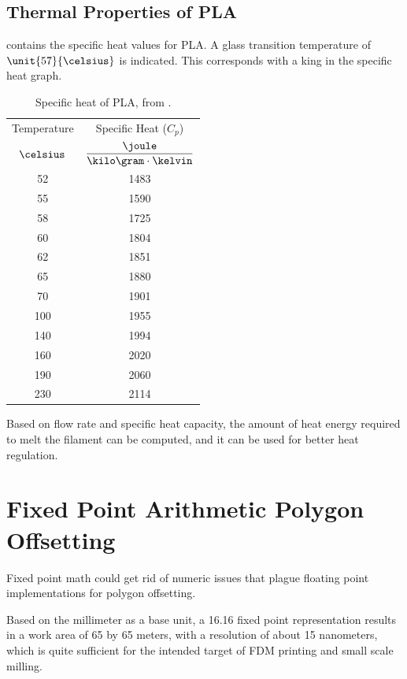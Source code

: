 \documentclass[12pt,a4paper,oneside,openany]{article}
\begin{document}
\subsection{Thermal Properties of PLA}

 contains the specific heat values for PLA. A glass transition temperature of $\unit{57}{\celsius}$ is indicated. This corresponds with a king in the specific heat graph.


\begin{table}[htdp]
\caption{Specific heat of PLA, from \cite{mfr}.}
\begin{center}
\begin{tabular}{cc}
\toprule Temperature & Specific Heat ($C_p$)\\
$\celsius$ & $\dfrac{\joule}{\kilo\gram \cdot \kelvin}$ \\
\midrule 52 & 1483 \\
55 & 1590 \\
58 & 1725 \\
60 & 1804 \\
62 & 1851 \\
65 & 1880 \\
70 & 1901 \\
100 & 1955 \\
140 & 1994 \\
160 & 2020 \\
190 & 2060 \\
230 & 2114 \\
\bottomrule 
\end{tabular}
\end{center}
\label{table:plaheat}
\end{table}%

Based on flow rate and specific heat capacity, the amount of heat energy required to melt the filament can be computed, and it can be used for better heat regulation.

\section{Fixed Point Arithmetic Polygon Offsetting}

Fixed point math could get rid of numeric issues that plague floating point implementations for polygon offsetting.

Based on the millimeter as a base unit, a 16.16 fixed point representation results in a work area of 65 by 65 meters, with a resolution of about 15 nanometers, which is quite sufficient for the intended target of FDM printing and small scale milling.
\end{document}

